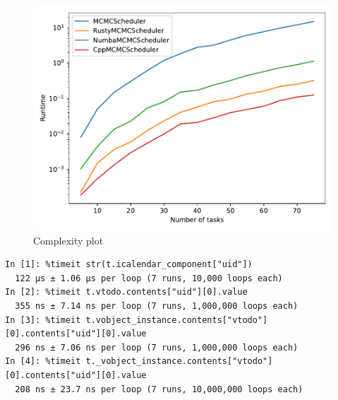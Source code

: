 \documentclass{prettytex/ox/mmsc-special-topic}
\begin{document}
  \begin{figure}[H]
    \centering
    \includegraphics[width=0.7\linewidth]{results/complexity.pdf}
    \caption{Complexity plot}
  \end{figure}

  \begin{verbatim}
In [1]: %timeit str(t.icalendar_component["uid"])
  122 µs ± 1.06 µs per loop (7 runs, 10,000 loops each)
In [2]: %timeit t.vtodo.contents["uid"][0].value
  355 ns ± 7.14 ns per loop (7 runs, 1,000,000 loops each)
In [3]: %timeit t.vobject_instance.contents["vtodo"][0].contents["uid"][0].value
  296 ns ± 7.06 ns per loop (7 runs, 1,000,000 loops each)
In [4]: %timeit t._vobject_instance.contents["vtodo"][0].contents["uid"][0].value
  208 ns ± 23.7 ns per loop (7 runs, 10,000,000 loops each)
  \end{verbatim}
\end{document}
